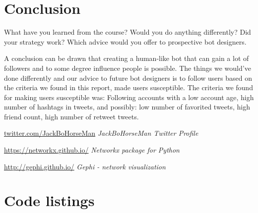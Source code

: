 \documentclass[10pt]{IEEEtran}
\begin{document}
\section{Conclusion}

What have you learned from the course? Would you do anything differently? Did your strategy work? Which advice would you offer to prospective bot designers.

A conclusion can be drawn that creating a human-like bot that can gain a lot of followers and to some degree influence people is possible. The things we would've done differently and our advice to future bot designers is to follow users based on the criteria we found in this report, made users susceptible. The criteria we found for making users susceptible was: Following accounts with a low account age, high number of hashtags in tweets, and possibly: low number of favorited tweets, high friend count, high number of retweet tweets.



\begin{thebibliography}{9}

\url{twitter.com/JackBoHorseMan}
\textit{JackBoHorseMan Twitter Profile}

\url{https://networkx.github.io/}
\textit{Networkx package for Python}

\url{http://gephi.github.io/}
\textit{Gephi - network visualization}

\end{thebibliography}

\clearpage
\onecolumn
\appendices
\section{Code listings}

\lstlistoflistings
\end{document}
